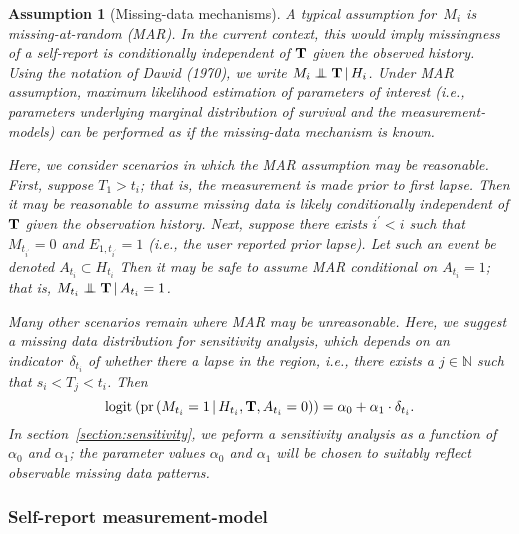 \documentclass[11pt]{amsart}
\def\pr{\mathop{\text{pr}}\nolimits}
\def\pr{\mathop{\text{pr}}\nolimits}
\def\logit{\mathop{\text{logit}_{}}\nolimits}
\def\logit{\mathop{\text{logit}_{}}\nolimits}
\newtheorem{assumption}[thm]{Assumption}
\def\indep{\mathrel{\rlap{$\perp$}\kern1.6pt\mathord{\perp}}}
\def\given{\, | \,}
\def\Nat{\mathbb{N}}
\def\bfT{{\bf T}}
\begin{document}
\begin{assumption}[Missing-data mechanisms] \normalfont
A typical assumption for~$M_i$ is \emph{missing-at-random} (MAR). In
the current context, this would imply missingness of a self-report is
conditionally independent of $\bfT$ given the observed history. Using
the notation of Dawid (1970), we write $M_{i} \indep \bfT \given
H_{i}$. Under MAR assumption, maximum likelihood estimation of
parameters of interest (i.e., parameters underlying marginal
distribution of survival and the measurement-models) can be performed
as if the missing-data mechanism is known.

Here, we consider scenarios in which the MAR assumption may be
reasonable.
First, suppose $T_1 > t_i$; that is, the measurement is made
prior to first lapse. Then it may be reasonable to assume missing data
is likely conditionally independent of $\bfT$ given the observation
history.  Next, suppose there exists $i^\prime < i$ such that
$M_{t_{i^\prime}} = 0$ and $E_{1,t_{i^\prime}} = 1$ (i.e., the user
reported prior lapse). Let such an event be denoted $A_{t_i} \subset
H_{t_i}$ Then it may be safe to assume MAR conditional on $A_{t_i} =
1$; that is, $M_{t_i} \indep \bfT \given A_{t_i} = 1$.

Many other scenarios remain where MAR may be unreasonable.  Here, we
suggest a missing data distribution for sensitivity analysis, which
depends on an indicator~$\delta_{t_i}$ of whether there a lapse in the 
region, i.e., there exists a $j \in \Nat$ such that $s_i < T_j <
t_i$. Then 
\[
\logit \left( \pr \left( M_{t_i} = 1 \given H_{t_i}, \bfT, A_{t_i} = 0
  \right) \right) = \alpha_0 + \alpha_1 \cdot \delta_{t_i}.
\]
In section~\ref{section:sensitivity}, we peform a sensitivity analysis
as a function of $\alpha_0$ and $\alpha_1$; the parameter values
$\alpha_0$ and $\alpha_1$ will be chosen to suitably reflect
observable missing data patterns. 
\end{assumption}

\subsubsection{Self-report measurement-model}
\end{document}
